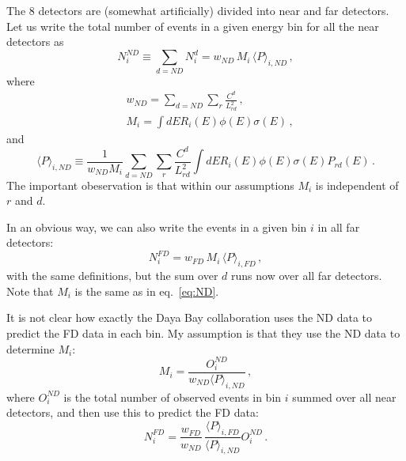 \documentclass[12pt,oneside, a4paper]{article}
\begin{document}
The 8 detectors are (somewhat artificially) divided into near and far
detectors. Let us write the total number of events in a given energy bin for
all the near detectors as
%
\begin{equation}\label{eq:ND}
  N^{ND}_i \equiv \sum_{d = ND} N^d_i = w_{ND}\, M_i \, \langle P \rangle_{i,ND} \,,
\end{equation}
where
\begin{align}
  & w_{ND} = \sum_{d=ND} \sum_r \frac{C^d}{L^2_{rd}} \,,\\
  & M_i = \int dE R_i(E) \phi(E) \sigma(E) \,,
\end{align}
and
\begin{equation}\label{eq:P}
\langle P \rangle_{i,ND} \equiv  \frac{1}{w_{ND} M_i}
\sum_{d=ND} \sum_r \frac{C^d}{L^2_{rd}} \int dE R_i(E) \phi(E) \sigma(E) P_{rd}(E) \,.
\end{equation}
%
The important obeservation is that within our assumptions $M_i$ is independent of $r$ and $d$.

In an obvious way, we can also write the events in a given bin $i$ in all far detectors:
%
\begin{equation}
  N^{FD}_i = w_{FD}\, M_i \, \langle P \rangle_{i,FD} \,,
\end{equation}
% 
with the same definitions, but the sum over $d$ runs now over all
far detectors. Note that $M_i$ is the same as in eq.~\eqref{eq:ND}.

 It is not clear how exactly the Daya Bay collaboration uses the ND data to predict the FD data in each bin. My assumption is that they use the ND data to determine $M_i$:
\begin{equation}
  M_i = \frac{O_i^{ND}}{w_{ND} \langle P \rangle_{i,ND}} \,,
\end{equation}
%
where $O_i^{ND}$ is the total number of observed  events in bin $i$ summed over all near 
detectors, and then use this to predict the FD data:
%
\begin{equation}\label{eq:FD}
  N^{FD}_i = \frac{w_{FD}}{w_{ND}}\, \frac{\langle P \rangle_{i,FD}}{\langle P \rangle_{i,ND}} 
  O_i^{ND} \,.  
\end{equation}
\end{document}
